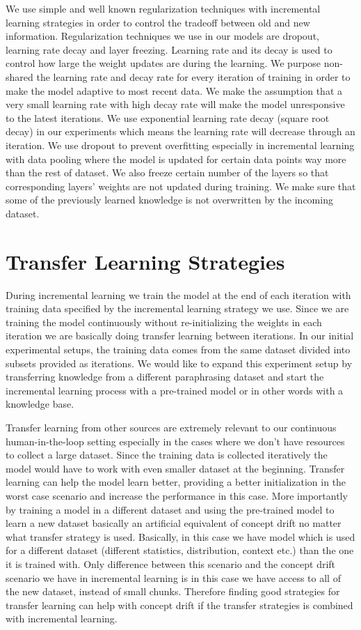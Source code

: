 We use simple and well known regularization techniques with incremental learning strategies in order to control the tradeoff between old and new information. Regularization techniques we use in our models are dropout, learning rate decay and layer freezing. Learning rate and its decay is used to control how large the weight updates are during the learning. We purpose non-shared the learning rate and decay rate for every iteration of training in order to make the model adaptive to most recent data. We make the assumption that a very small learning rate with high decay rate will make the model unresponsive to the latest iterations. We use exponential learning rate decay (square root decay) in our experiments which means the learning rate will decrease through an iteration. We use dropout to prevent overfitting especially in incremental learning with data pooling where the model is updated for certain data points way more than the rest of dataset. We also freeze certain number of the layers so that corresponding layers' weights are not updated during training. We make sure that some of the previously learned knowledge is not overwritten by the incoming dataset. 

\section{Transfer Learning Strategies}

During incremental learning we train the model at the end of each iteration with training data specified by the incremental learning strategy we use. Since we are training the model continuously without re-initializing the weights in each iteration we are basically doing transfer learning between iterations. In our initial experimental setups, the training data comes from the same dataset divided into subsets provided as iterations. We would like to expand this experiment setup by transferring knowledge from a different paraphrasing dataset and start the incremental learning process with a pre-trained model or in other words with a knowledge base. 

Transfer learning from other sources are extremely relevant to our continuous human-in-the-loop setting especially in the cases where we don't have resources to collect a large dataset. Since the training data is collected iteratively the model would have to work with even smaller dataset at the beginning. Transfer learning can help the model learn better, providing a better initialization in the worst case scenario and increase the performance in this case. More importantly by training a model in a different dataset and using the pre-trained model to learn a new dataset basically an artificial equivalent of concept drift no matter what transfer strategy is used. Basically, in this case we have model which is used for a different dataset (different statistics, distribution, context etc.) than the one it is trained with. Only difference between this scenario and the concept drift scenario we have in incremental learning is in this case we have access to all of the new dataset, instead of small chunks. Therefore finding good strategies for transfer learning can help with concept drift if the transfer strategies is combined with incremental learning. 

